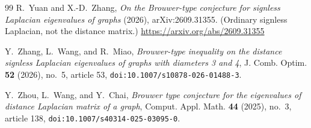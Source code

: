 \documentclass[11pt,a4paper]{article}
\theoremstyle{remark}
\begin{document}
\begin{thebibliography}{99}
R.~Yuan and X.-D.~Zhang,
\emph{On the Brouwer-type conjecture for signless Laplacian eigenvalues of graphs}
(2026), arXiv:2609.31355. (Ordinary signless Laplacian, not the distance matrix.)
\url{https://arxiv.org/abs/2609.31355}

Y.~Zhang, L.~Wang, and R.~Miao,
\emph{Brouwer-type inequality on the distance signless Laplacian eigenvalues of graphs with diameters 3 and 4},
J. Comb. Optim. \textbf{52} (2026), no.~5, article 53, \texttt{doi:10.1007/s10878-026-01488-3}.

Y.~Zhou, L.~Wang, and Y.~Chai,
\emph{Brouwer type conjecture for the eigenvalues of distance Laplacian matrix of a graph},
Comput. Appl. Math. \textbf{44} (2025), no.~3, article 138, \texttt{doi:10.1007/s40314-025-03095-0}.
\end{thebibliography}
\end{document}
